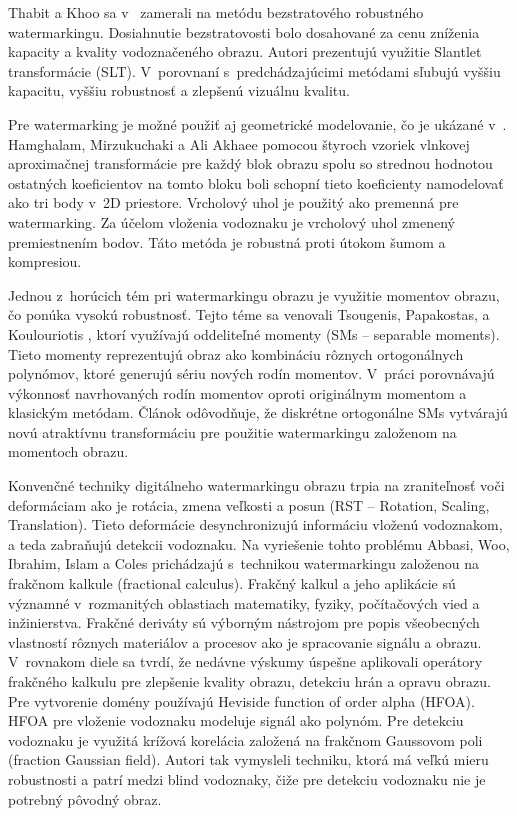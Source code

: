 Thabit a Khoo sa v~\cite{Thabit2014-11-01} zamerali na metódu bezstratového robustného watermarkingu. Dosiahnutie bezstratovosti bolo dosahované za cenu zníženia kapacity a kvality vodoznačeného obrazu. Autori prezentujú využitie Slantlet transformácie (SLT). V~porovnaní s~predchádzajúcimi metódami sľubujú vyššiu kapacitu, vyššiu robustnosť a zlepšenú vizuálnu kvalitu.

Pre watermarking je možné použiť aj geometrické modelovanie, čo je ukázané v~\cite{Hamghalam2015}. Hamghalam, Mirzukuchaki a Ali Akhaee pomocou štyroch vzoriek vlnkovej aproximačnej transformácie pre každý blok obrazu spolu so strednou hodnotou ostatných koeficientov na tomto bloku boli schopní tieto koeficienty namodelovať ako tri body v~2D priestore. Vrcholový uhol je použitý ako premenná pre watermarking. Za účelom vloženia vodoznaku je vrcholový uhol zmenený premiestnením bodov. Táto metóda je robustná proti útokom šumom a kompresiou.

Jednou z~horúcich tém pri watermarkingu obrazu je využitie momentov obrazu, čo ponúka vysokú robustnosť. Tejto téme sa venovali Tsougenis, Papakostas, a Koulouriotis \cite{Tsougenis2015}, ktorí využívajú oddeliteľné momenty (SMs – separable moments). Tieto momenty reprezentujú obraz ako kombináciu rôznych ortogonálnych polynómov, ktoré generujú sériu nových rodín momentov. V~práci porovnávajú výkonnosť navrhovaných rodín momentov oproti originálnym momentom a klasickým metódam. Článok odôvodňuje, že diskrétne ortogonálne SMs vytvárajú novú atraktívnu transformáciu pre použitie watermarkingu založenom na momentoch obrazu.

Konvenčné techniky digitálneho watermarkingu obrazu trpia na zraniteľnosť voči deformáciam ako je rotácia, zmena veľkosti a posun (RST – Rotation, Scaling, Translation). Tieto deformácie desynchronizujú informáciu vloženú vodoznakom, a teda zabraňujú detekcii vodoznaku. Na vyriešenie tohto problému Abbasi, Woo, Ibrahim, Islam a Coles \cite{Abbasi2015} prichádzajú s~technikou watermarkingu založenou na frakčnom kalkule (fractional calculus). Frakčný kalkul a jeho aplikácie sú významné v~rozmanitých oblastiach matematiky, fyziky, počítačových vied a inžinierstva. Frakčné deriváty sú výborným nástrojom pre popis všeobecných vlastností rôznych materiálov a procesov ako je spracovanie signálu a obrazu. V~rovnakom diele sa tvrdí, že nedávne výskumy úspešne aplikovali operátory frakčného kalkulu pre zlepšenie kvality obrazu, detekciu hrán a opravu obrazu. Pre vytvorenie domény používajú Heviside function of order alpha (HFOA). HFOA pre vloženie vodoznaku modeluje signál ako polynóm. Pre detekciu vodoznaku je využitá krížová korelácia založená na frakčnom Gaussovom poli (fraction Gaussian field). Autori tak vymysleli techniku, ktorá má veľkú mieru robustnosti a patrí medzi blind vodoznaky, čiže pre detekciu vodoznaku nie je potrebný pôvodný obraz.

